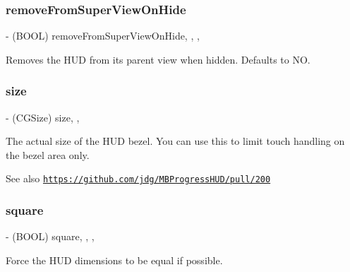 \subsubsection{\texorpdfstring{remove\+From\+Super\+View\+On\+Hide}{removeFromSuperViewOnHide}}
{\footnotesize\ttfamily -\/ (B\+O\+OL) remove\+From\+Super\+View\+On\+Hide\hspace{0.3cm}{\ttfamily [read]}, {\ttfamily [write]}, {\ttfamily [atomic]}, {\ttfamily [assign]}}

Removes the H\+UD from its parent view when hidden. Defaults to NO. \mbox{\label{interface_m_b_progress_h_u_d_a0c987a2e4026910e21167e95fee7b4e4}} 
\subsubsection{\texorpdfstring{size}{size}}
{\footnotesize\ttfamily -\/ (C\+G\+Size) size\hspace{0.3cm}{\ttfamily [read]}, {\ttfamily [atomic]}, {\ttfamily [assign]}}

The actual size of the H\+UD bezel. You can use this to limit touch handling on the bezel area only. \begin{DoxySeeAlso}{See also}
\href{https://github.com/jdg/MBProgressHUD/pull/200}{\tt https\+://github.\+com/jdg/\+M\+B\+Progress\+H\+U\+D/pull/200} 
\end{DoxySeeAlso}
\mbox{\label{interface_m_b_progress_h_u_d_a4bf7271b213e304259aa7d97f7cb1849}} 
\subsubsection{\texorpdfstring{square}{square}}
{\footnotesize\ttfamily -\/ (B\+O\+OL) square\hspace{0.3cm}{\ttfamily [read]}, {\ttfamily [write]}, {\ttfamily [atomic]}, {\ttfamily [assign]}}

Force the H\+UD dimensions to be equal if possible. \mbox{\label{interface_m_b_progress_h_u_d_a6077ea42c37c18b3058ed63ac10ede8f}} 
